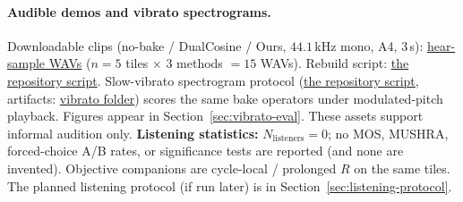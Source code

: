 
\paragraph{Audible demos and vibrato spectrograms.}
Downloadable clips (no-bake / DualCosine / Ours, $44.1$\,kHz mono, A4, $3$\,s):
\href{https://github.com/reeldemo/denoise-opt}{hear-sample WAVs}
($n{=}5$ tiles $\times$ $3$ methods $=15$ WAVs).
Rebuild script:
\href{https://github.com/reeldemo/denoise-opt}{the repository script}.
Slow-vibrato spectrogram protocol
(\href{https://github.com/reeldemo/denoise-opt}{the repository script},
artifacts:
\href{https://github.com/reeldemo/denoise-opt}{vibrato folder})
scores the same bake operators under modulated-pitch playback. Figures appear in Section~\ref{sec:vibrato-eval}.
These assets support informal audition only.
\textbf{Listening statistics:} $N_{\mathrm{listeners}}{=}0$; no MOS, MUSHRA, forced-choice A/B rates, or significance tests are reported (and none are invented).
Objective companions are cycle-local / prolonged $R$ on the same tiles.
The planned listening protocol (if run later) is in Section~\ref{sec:listening-protocol}.
